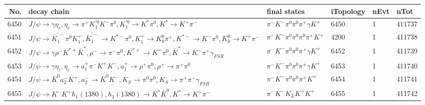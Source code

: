 \begin{table}[htbp] 
\begin{center}
\begin{small}
\begin{tabular}{rlllll}\hline\hline
 No. & decay chain & final states &  iTopology & nEvt & nTot \\\hline
6450&$J/\psi       \rightarrow \gamma       \eta_{c}    , \eta_{c}     \rightarrow \pi^{+}        K_1^{'0}      K^{-}          \pi^{0}        , K_1^{'0}       \rightarrow K^{*}          \pi^{0}        , K^{*}           \rightarrow K^{+}          \pi^{-}        $&$\pi^{-}        K^{-}          \pi^{0}        \pi^{0}        \pi^{+}        \gamma       K^{+}          $& 6450&    1&411737\\
6451&$J/\psi       \rightarrow \bar{K}_1^{'-}\pi^{0}        K_1^{+}        , \bar{K}_1^{'-} \rightarrow K^{*-}         \pi^{0}        , K_1^{+}         \rightarrow K_0^{0}        \pi^{+}        , K^{*-}          \rightarrow K^{-}          \pi^{0}        , K_0^{0}         \rightarrow K^{+}          \pi^{-}        $&$\pi^{-}        K^{-}          \pi^{0}        \pi^{0}        \pi^{0}        \pi^{+}        K^{+}          $& 4200&    1&411738\\
6452&$J/\psi       \rightarrow \gamma       \rho^{-}      K^{*+}         \bar{K}^{*}   , \rho^{-}       \rightarrow \pi^{-}        \pi^{0}        , K^{*+}          \rightarrow K^{+}          \pi^{0}        , \bar{K}^{*}    \rightarrow K^{-}          \pi^{+}        \gamma_{FSR} $&$\pi^{-}        K^{-}          \pi^{0}        \pi^{0}        \pi^{+}        \gamma       K^{+}          $& 6452&    1&411739\\
6453&$J/\psi       \rightarrow \gamma       \eta_{c}    , \eta_{c}     \rightarrow a_{1}^{+}      \pi^{-}        K^{+}          K^{-}          , a_{1}^{+}       \rightarrow \rho^{+}      \pi^{0}        , \rho^{+}       \rightarrow \pi^{+}        \pi^{0}        $&$\pi^{-}        K^{-}          \pi^{0}        \pi^{0}        \pi^{+}        \gamma       K^{+}          $& 6453&    1&411740\\
6454&$J/\psi       \rightarrow \bar{K}^{0}   a_{2}^{-}      K^{+}          , a_{2}^{-}       \rightarrow \bar{K}^{0}   K^{-}          , K_{S}           \rightarrow \pi^{0}        \pi^{0}        , K_{S}           \rightarrow \pi^{+}        \pi^{-}        \gamma_{FSR} $&$\pi^{-}        K^{-}          \pi^{0}        \pi^{0}        \pi^{+}        K^{+}          $& 6454&    1&411741\\
6455&$J/\psi       \rightarrow K^{-}          K^{+}          h_{1}(1380)    , h_{1}(1380)     \rightarrow K^{*}          \bar{K}^{0}   , K^{*}           \rightarrow K^{+}          \pi^{-}        $&$\pi^{-}        K^{-}          K_{L}          K^{+}          K^{+}          $& 6455&    1&411742\\

\end{tabular}
\end{small}
\end{center}
\end{table}
